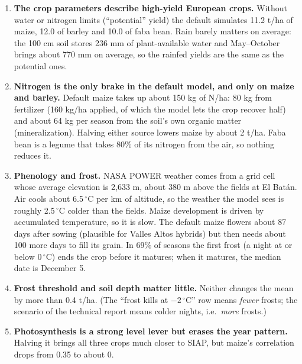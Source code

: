 \documentclass[11pt,a4paper]{article}
\newcommand{\code}[1]{\texttt{\detokenize{#1}}}
\begin{document}
\begin{enumerate}[leftmargin=*]
  \item \textbf{The crop parameters describe high-yield European crops.} Without water or nitrogen limits
        (``potential'' yield) the default simulates 11.2 t/ha of maize, 12.0 of barley and 10.0 of faba bean.
        Rain barely matters on average: the 100 cm soil stores 236 mm of plant-available water and May--October
        brings about 770 mm on average, so the rainfed yields are the same as the potential ones.
  \item \textbf{Nitrogen is the only brake in the default model, and only on maize and barley.} Default maize takes
        up about 150 kg of N/ha: 80 kg from fertilizer (160 kg/ha applied, of which the model lets the crop recover
        half) and about 64 kg per season from the soil's own organic matter (mineralization). Halving either source
        lowers maize by about 2 t/ha. Faba bean is a legume that takes 80\% of its nitrogen from the air, so nothing
        reduces it.
  \item \textbf{Phenology and frost.} NASA POWER weather comes from a grid cell whose average elevation is
        2,633 m, about 380 m above the fields at El Batán. Air cools about 6.5\,\(^\circ\)C per km of altitude, so
        the weather the model sees is roughly 2.5\,\(^\circ\)C colder than the fields. Maize development is driven by
        accumulated temperature, so it is slow. The default maize flowers about 87 days after sowing (plausible for
        Valles Altos hybrids) but then needs about 100 more days to fill its grain. In 69\% of seasons the first
        frost (a night at or below 0\,\(^\circ\)C) ends the crop before it matures; when it matures, the median
        date is December 5.
  \item \textbf{Frost threshold and soil depth matter little.} Neither changes the mean by more than 0.4 t/ha. (The
        ``frost kills at \(-2\,^\circ\)C'' row means \emph{fewer} frosts; the \code{frost_minus2} scenario of the
        technical report means colder nights, i.e.\ \emph{more} frosts.)
  \item \textbf{Photosynthesis is a strong level lever but erases the year pattern.} Halving it brings all three crops
        much closer to SIAP, but maize's correlation drops from 0.35 to about 0.
\end{enumerate}
\end{document}
